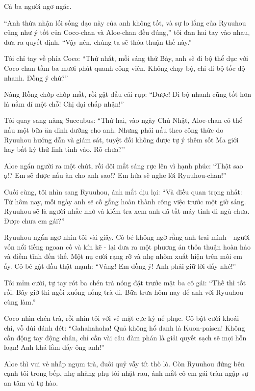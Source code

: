 \documentclass[../main.tex]{subfiles}
\begin{document}
Cả ba người ngơ ngác.

``Anh thừa nhận lối sống dạo này của anh không tốt, và sự lo lắng của Ryuuhou cũng như ý tốt của Coco-chan và Aloe-chan đều đúng,'' tôi đan hai tay vào nhau, đưa ra quyết định. ``Vậy nên, chúng ta sẽ thỏa thuận thế này.''

Tôi chỉ tay về phía Coco: ``Thứ nhất, mỗi sáng thứ Bảy, anh sẽ đi bộ thể dục với Coco-chan tầm ba mươi phút quanh công viên. Không chạy bộ, chỉ đi bộ tốc độ nhanh. Đồng ý chứ?''

Nàng Rồng chớp chớp mắt, rồi gật đầu cái rụp: ``Được! Đi bộ nhanh cũng tốt hơn là nằm dí một chỗ! Chị đại chấp nhận!''

Tôi quay sang nàng Succubus: ``Thứ hai, vào ngày Chủ Nhật, Aloe-chan có thể nấu một bữa ăn dinh dưỡng cho anh. Nhưng phải nấu theo công thức do Ryuuhou hướng dẫn và giám sát, tuyệt đối không được tự ý thêm sốt Ma giới hay bất kỳ thứ linh tinh vào. Rõ chưa?''

Aloe ngẩn người ra một chút, rồi đôi mắt sáng rực lên vì hạnh phúc: ``Thật sao ạ!? Em sẽ được nấu ăn cho anh sao!? Em hứa sẽ nghe lời Ryuuhou-chan!''

Cuối cùng, tôi nhìn sang Ryuuhou, ánh mắt dịu lại: ``Và điều quan trọng nhất: Từ hôm nay, mỗi ngày anh sẽ cố gắng hoàn thành công việc trước một giờ sáng. Ryuuhou sẽ là người nhắc nhở và kiểm tra xem anh đã tắt máy tính đi ngủ chưa. Được chưa em gái?''

Ryuuhou ngẩn ngơ nhìn tôi vài giây. Cô bé không ngờ rằng anh trai mình - người vốn nổi tiếng ngoan cố và kín kẽ - lại đưa ra một phương án thỏa thuận hoàn hảo và điềm tĩnh đến thế. Một nụ cười rạng rỡ và nhẹ nhõm xuất hiện trên môi em ấy. Cô bé gật đầu thật mạnh: ``Vâng! Em đồng ý! Anh phải giữ lời đấy nhé!''

Tôi mỉm cười, tự tay rót ba chén trà nóng đặt trước mặt ba cô gái: ``Thế thì tốt rồi. Bây giờ thì ngồi xuống uống trà đi. Bữa trưa hôm nay để anh với Ryuuhou cùng làm.''

Coco nhìn chén trà, rồi nhìn tôi với vẻ mặt cực kỳ nể phục. Cô bật cười khoái chí, vỗ đùi đánh đét: ``Gahahahaha! Quả không hổ danh là Kuon-paisen! Không cần động tay động chân, chỉ cần vài câu đàm phán là giải quyết sạch sẽ mọi hỗn loạn! Anh khá lắm đấy ông anh!''

Aloe thì vui vẻ nhấp ngụm trà, đuôi quỷ vẫy tít thò lò. Còn Ryuuhou đứng bên cạnh tôi trong bếp, nhẹ nhàng phụ tôi nhặt rau, ánh mắt cô em gái tràn ngập sự an tâm và tự hào.

\ct
\end{document}

